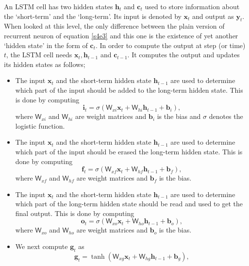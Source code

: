 \documentclass[11pt]{article}
\numberwithin{equation}{section}
\renewcommand{\vec}{\mathbf}
\newcommand{\mat}{\mathsf}
\begin{document}
An LSTM cell has two hidden states $\vec{h}_t$ and $\vec{c}_t$ used to 
store information about the `short-term' and the `long-term'. Its input is
denoted by $\vec{x}_t$ and output as $\vec{y}_t$. When looked at this level,
the only difference between the plain version of recurrent neuron of equation
\eqref{s4e3} and this one is the existence of yet another `hidden state' in the
form of $\vec{c}_t$. In order to compute the output at step (or time) $t$, the
LSTM cell needs $\vec{x}_t, \vec{h}_{t-1}$ and $\vec{c}_{t-1}$. It computes
the output and updates its hidden states as follows;
\begin{itemize}
\item The input $\vec{x}_t$ and the short-term hidden state $\vec{h}_{t-1}$ are
used to determine which part of the input should be added to the long-term
hidden state. This is done by computing
\begin{equation}\label{s4e4}
\vec{i}_t = \sigma\left(\mat{W}_{xi}\vec{x}_t + \mat{W}_{hi}\vec{h}_{t-1} + 
\vec{b}_i\right),
\end{equation}
where $\mat{W}_{xi}$ and $\mat{W}_{hi}$ are weight matrices and $\vec{b}_i$ is
the bias and $\sigma$ denotes the logistic function.
\item The input $\vec{x}_t$ and the short-term hidden state $\vec{h}_{t-1}$ are
used to determine which part of the input should be erased the long-term
hidden state. This is done by computing
\begin{equation}\label{s4e5}
\vec{f}_t = \sigma\left(\mat{W}_{xf}\vec{x}_t + \mat{W}_{hf}\vec{h}_{t-1} + 
\vec{b}_f\right),
\end{equation}
where $\mat{W}_{xf}$ and $\mat{W}_{hf}$ are weight matrices and $\vec{b}_f$ is
the bias.
\item The input $\vec{x}_t$ and the short-term hidden state $\vec{h}_{t-1}$ are
used to determine which part of the long-term hidden state should be read and
used to get the final output. This is done by computing
\begin{equation}\label{s4e6}
\vec{o}_t = \sigma\left(\mat{W}_{xo}\vec{x}_t + \mat{W}_{ho}\vec{h}_{t-1} + 
\vec{b}_o\right),
\end{equation}
where $\mat{W}_{xo}$ and $\mat{W}_{ho}$ are weight matrices and $\vec{b}_o$ is
the bias.
\item We next compute $\vec{g}_t$ as
\begin{equation}\label{s4e7}
\vec{g}_t = \tanh\left(\mat{W}_{xg}\vec{x}_t + \mat{W}_{hg}\vec{h}_{t-1} + 
\vec{b}_g\right),
\end{equation}


\end{itemize}
\end{document}
